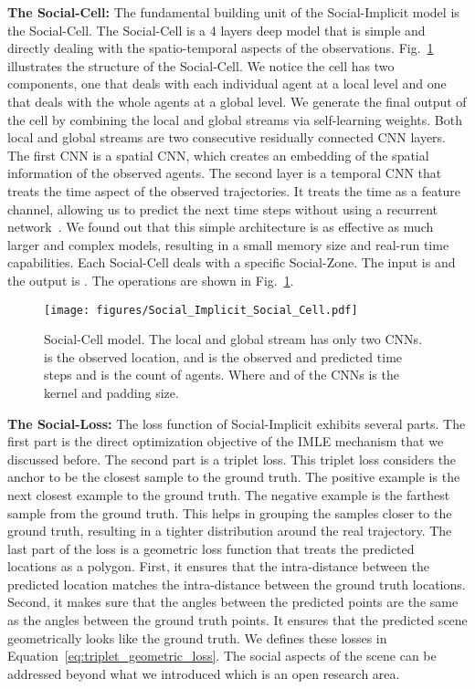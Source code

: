 \documentclass[runningheads]{llncs}
\begin{document}
\noindent\textbf{The Social-Cell: }The fundamental building unit of the Social-Implicit model is the Social-Cell. The Social-Cell is a 4 layers deep model that is simple and directly dealing with the spatio-temporal aspects of the observations. Fig.~\ref{gr:social_implicit_social_cell} illustrates the structure of the Social-Cell. We notice the cell has two components, one that deals with each individual agent at a local level and one that deals with the whole agents at a global level. We generate the final output of the cell by combining the local and global streams via self-learning weights. Both local and global streams are two consecutive residually connected CNN layers. The first CNN is a spatial CNN, which creates an embedding of the spatial information of the observed agents. The second layer is a temporal CNN that treats the time aspect of the observed trajectories. It treats the time as a feature channel, allowing us to predict the next  time steps without using a recurrent network~\cite{mohamed2020social}. We found out that this simple architecture is as effective as much larger and complex models, resulting in a small memory size and real-run time capabilities. Each Social-Cell deals with a specific Social-Zone. The input is  and the output is . The operations are shown in Fig.~\ref{gr:social_implicit_social_cell}.
\begin{figure}[t]
\begin{center}
\texttt{[image: figures/Social\_Implicit\_Social\_Cell.pdf]}
   \caption{Social-Cell model. The local and global stream has only two CNNs.  is the observed location,  and  is the observed and predicted time steps and  is the count of agents. Where  and  of the CNNs is the kernel and padding size.}
\label{gr:social_implicit_social_cell}
   \end{center}
\end{figure}
\textbf{The Social-Loss: }The loss function of Social-Implicit exhibits several parts. The first part is the direct optimization objective of the IMLE mechanism that we discussed before. The second part is a triplet loss. This triplet loss considers the anchor to be the closest sample  to the ground truth. The positive example is the next closest example  to the ground truth. The negative example  is the farthest sample from the ground truth. This helps in grouping the samples closer to the ground truth, resulting in a tighter distribution around the real trajectory. The last part of the loss is a geometric loss function that treats the predicted locations as a polygon. First, it ensures that the intra-distance between the predicted location matches the intra-distance between the ground truth locations. Second, it makes sure that the angles between the predicted points are the same as the angles between the ground truth points. It ensures that the predicted scene geometrically looks like the ground truth. We defines these losses in Equation~\ref{eq:triplet_geometric_loss}. The social aspects of the scene can be addressed beyond what we introduced which is an open research area. 
\end{document}
